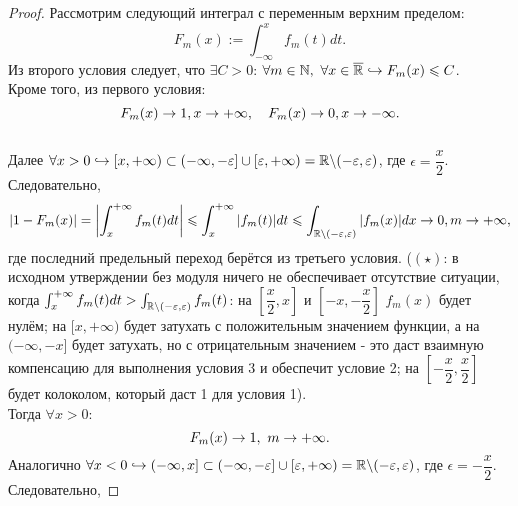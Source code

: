 \begin{proof}
    Рассмотрим следующий интеграл с переменным верхним пределом:
    \[
        F_m(x) := \int_{-\infty}^{x} f_m(t)dt.
    \]
    Из второго условия следует, что $\exists C > 0$: $\forall m \in \mathbb{N}, \ \forall x \in \overline{\mathbb{R}} \hookrightarrow F_m (x) \leqslant C$.\\
    Кроме того, из первого условия:
    \[
        F_m(x) \rightarrow 1, x \rightarrow +\infty, \quad F_m(x) \rightarrow 0, x \rightarrow -\infty.
    \]
    \\
    Далее $\forall x > 0 \hookrightarrow[x, +\infty) \subset (-\infty, -\varepsilon] \cup [\varepsilon, +\infty) = \mathbb{R} \backslash(-\varepsilon, \varepsilon)$, где $\epsilon = \dfrac{x}{2}$. Следовательно,
    \[ |1 - F_m(x)| =
    \left|\int_x^{+\infty} f_m(t)dt\right| \leqslant \int_x^{+\infty} |f_m(t)|dt \leqslant \int_{\mathbb{R} \setminus (-\varepsilon, \varepsilon)} |f_m(x)|dx \rightarrow 0, m \rightarrow +\infty,
    \]
    где последний предельный переход берётся из третьего условия. ($(\star)$: в исходном утверждении без модуля ничего не обеспечивает отсутствие ситуации, когда $\int_x^{+\infty}f_m(t)dt > \int_{\mathbb{R} \setminus (-\varepsilon, \varepsilon)} f_m(t)$: на $[\dfrac{x}{2}, x]$ и $\left[-x, -\dfrac{x}{2}\right]$ $f_m(x)$ будет нулём; на $[x, +\infty)$ будет затухать с положительным значением функции, а на $(-\infty, -x]$ будет затухать, но с отрицательным значением - это даст взаимную компенсацию для выполнения условия 3 и обеспечит условие 2; на $\left[-\dfrac{x}{2}, \dfrac{x}{2}\right]$ будет колоколом, который даст 1 для условия 1).\\
    Тогда $\forall x > 0$:
    \[
        F_m(x) \rightarrow 1, \ m \rightarrow +\infty.
    \]
    Аналогично $\forall x < 0 \hookrightarrow (-\infty, x] \subset (-\infty, -\varepsilon] \cup [\varepsilon, +\infty) = \mathbb{R} \backslash(-\varepsilon, \varepsilon)$, где $\epsilon = -\dfrac{x}{2}$. Следовательно,


\end{proof}
